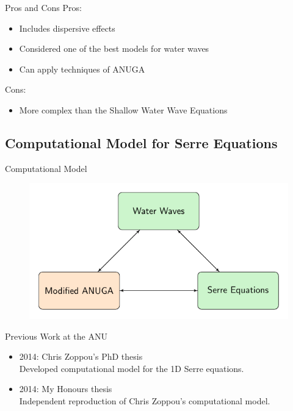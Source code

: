 \documentclass[]{beamer}
\begin{document}
\begin{frame}{Pros and Cons}
	Pros:
	\begin{itemize}
		\item Includes dispersive effects
		\item Considered one of the best models for water waves
		\item Can apply techniques of ANUGA
	\end{itemize}
	Cons:
	\begin{itemize}
		\item More complex than the Shallow Water Wave Equations
	\end{itemize}
\end{frame}
\subsection{Computational Model for Serre Equations}
\begin{frame}{Computational Model}
	\begin{figure}
		\includegraphics[width=\textwidth]{./Pics/ModelDiagrams/FlowChartSerre12G3O.pdf}
	\end{figure}
\end{frame}
\begin{frame}{Previous Work at the ANU}
	\begin{itemize}
		\item 2014: Chris Zoppou's PhD thesis  \\
			Developed computational model for the 1D Serre equations.
		\item 2014: My Honours thesis \\
			Independent reproduction of Chris Zoppou's computational model.
	\end{itemize}
\end{frame}
\end{document}
